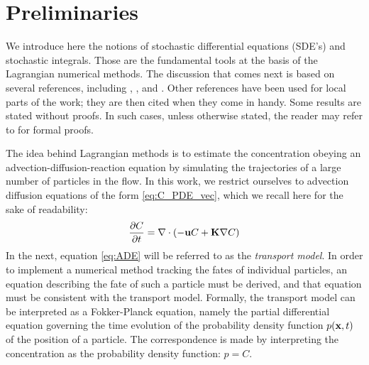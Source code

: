 \section{Preliminaries}
We introduce here the notions of stochastic differential equations (SDE's) and stochastic integrals. Those are the fundamental tools at the basis of the Lagrangian numerical methods. The discussion that comes next is based on several references, including \cite{gardiner1985stochastic}, \cite{heemink2011slides}, \cite{keunings} and \cite{spivakovskaya2007lagrangian}. Other references have been used for local parts of the work; they are then cited when they come in handy. Some results are stated without proofs. In such cases, unless otherwise stated, the reader may refer to \cite{gardiner1985stochastic} for formal proofs.

The idea behind Lagrangian methods is to estimate the concentration obeying an advection-diffusion-reaction equation by simulating the trajectories of a large number of particles in the flow. In this work, we restrict ourselves to advection diffusion equations of the form \eqref{eq:C_PDE_vec}, which we recall here for the sake of readability:
\begin{equation} \label{eq:ADE}
	\frac{\partial C}{\partial t} = \nabla \cdot (-\mathbf u C + \mathbf K \nabla C)
\end{equation}
In the next, equation \eqref{eq:ADE} will be referred to as the \textit{transport model}. In order to implement a numerical method tracking the fates of individual particles, an equation describing the fate of such a particle must be derived, and that equation must be consistent with the transport model. Formally, the transport model can be interpreted as a Fokker-Planck equation, namely the partial differential equation governing the time evolution of the probability density function $p(\mathbf x,t)$ of the position of a particle. The correspondence is made by interpreting the concentration as the probability density function: $p=C$. 

